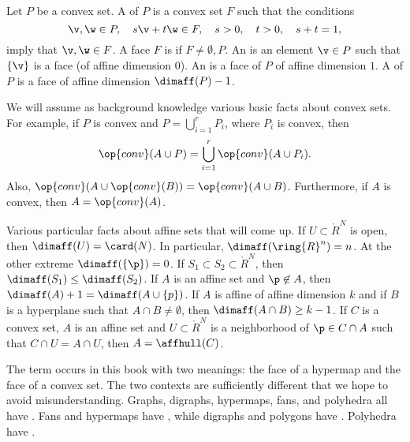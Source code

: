 \begin{definition}
Let $P$ be a convex set.  A  of $P$ is a convex set
$F$ such that the conditions
\begin{displaymath}
\v,\w\in P,\quad s \v + t \w \in F,\quad s>0,\quad t>0,\quad s+t = 1,
\end{displaymath} 
imply that $\v,\w\in F$.  A face $F$ is  if $F\ne
\emptyset,P$.  An  is an element $\v\in P$ such that
$\{\v\}$ is a face (of affine dimension $0$).  An   is a face of $P$ of
affine dimension $1$.  A  of $P$ is a 
face of affine dimension $\dimaff(P)-1$.  %
\end{definition}

\begin{remark}\label{rem:convex-background}
We will assume as background knowledge various basic facts about convex sets.
For example,
if $P$ is convex and $P = \bigcup_{i=1}^r P_i$, where $P_i$ is convex, then
\begin{displaymath}
\op{conv}(A\cup P ) = \bigcup_{i=1}^r\op{conv}(A\cup P_i).
\end{displaymath}
Also, $\op{conv}(A\cup \op{conv}(B)) = \op{conv}(A \cup B)$.
Furthermore, if $A$ is convex, then $A = \op{conv}(A)$.
\end{remark}


\begin{remark}\label{rem:affine-background}
Various particular facts about affine sets that will come up.
If $U\subset\ring{R}^N$ is open, then $\dimaff(U) = \card(N)$.  In particular,
$\dimaff(\ring{R}^n) = n$.  At the other extreme $\dimaff(\{\p\}) = 0$.
If $S_1\subset S_2\subset\ring{R}^N$, then $\dimaff(S_1) \le \dimaff(S_2)$.
If $A$ is an affine set and $\p\not\in A$, then $\dimaff(A) +1 = \dimaff(A\cup\{p\})$.
If $A$ is affine of affine dimension $k$ and if $B$ is a hyperplane such that $A\cap B\ne\emptyset$, then $\dimaff (A\cap B)\ge k-1$.
If $C$ is a convex set, $A$ is an affine set and $U\subset \ring{R}^N$ 
is a neighborhood of $\p\in C\cap A$ such that $C\cap U = A\cap U$, then
$A=\affhull(C)$.
\end{remark}


\begin{remark}\label{remark:face} 
The term  occurs in this book with two meanings: the
face of a hypermap and the face of a convex set.  The two contexts
are sufficiently different that we hope to avoid misunderstanding.
Graphs, digraphs, hypermaps, fans, and polyhedra all have .
Fans and hypermaps have , while digraphs and polygons 
have .  Polyhedra have .
\end{remark}


